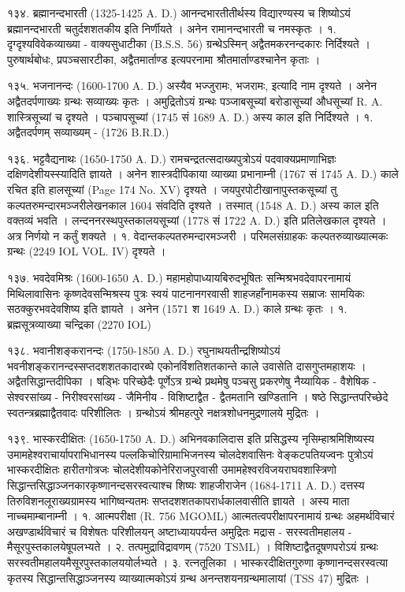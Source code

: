 १३४. ब्रह्मानन्दभारती (1325-1425 A. D.)
आनन्दभारतीतीर्थस्य विद्यारण्यस्य च शिष्योऽयं ब्रह्मानन्दभारती चतुर्दशशतकीय इति निर्णीयते । अनेन रामानन्दभारती च नमस्कृतः ।
१. दृग्दृश्यविवेकव्याख्या - वाक्यसुधाटीका (B.S.S. 56) ग्रन्थेऽस्मिन् अद्वैतमकरनन्दकारः निर्दिश्यते ।
पुरुषार्थबोधः, प्रपञ्चसारटीका, अद्वैतमार्ताण्ड इत्यपरनामा श्रौतमार्ताण्डश्चानेेन कृताः ।

१३५. भजनानन्दः (1600-1700 A. D.)
अस्यैव भज्जुरामः, भजरामः, इत्यादि नाम दृश्यते । अनेन अद्वैतदर्पणाख्यः ग्रन्थः सव्याख्यः कृतः । अमुद्रितोऽयं ग्रन्थः पञ्जाबसूच्यां बरोडासूच्यां औधसूच्यां R. A. शास्त्रिसूच्यां च दृश्यते । पञ्चापसूच्यां (1745 सं 1689 A. D.) अस्य काल इति निर्दिश्यते ।
१. अद्वैतदर्पणम् सव्याख्यम् - (1726 B.R.D.)

१३६. भट्टवैद्यनाथः (1650-1750 A. D.)
रामचन्द्रतत्सदाख्यपुत्रोऽयं पदवाक्यप्रमाणाभिज्ञः दक्षिणदेशीयस्स्यादिति ज्ञायते । अनेन शास्त्रदीपिकाया व्याख्या प्रभानाम्नी (1767 सं 1745 A. D.) काले रचित इति हालसूच्यां (Page 174 No. XV) दृश्यते । जयपुरपोटीखानापुस्तकसूच्यां तु कल्पतरुमन्दारमञ्जरीलेखनकाल 1604 संवदिति दृश्यते । तस्मात् (1548 A. D.) अस्य काल इति वक्तव्यं भवति । लन्दननरस्थपुस्तकालयसूच्यां (1778 सं 1722 A. D.) इति प्रतिलेखकाल दृश्यते । अत्र निर्णयो न कर्तुं शक्यते ।
१. वेदान्तकल्पतरुमन्दारमञ्जरी । परिमलसंग्राहकः कल्पतरुव्याख्यात्मकः ग्रन्थः (2249 IOL VOL. IV) दृश्यते ।

१३७. भवदेवमिश्रः (1600-1650 A. D.)
महामहोपाध्यायबिरुदभूषितः सन्मिश्रभवदेवापरनामायं मिथिलावासिनः कृष्णदेवसन्मिश्रस्य पुत्रः स्वयं पाटनानगरवासी शाहजहाँनामकस्य सम्राजः सामयिकः सठक्कुरभवदेवशिष्य इति ज्ञायते । अनेन (1571 श 1649 A. D.) काले ग्रन्थः कृतः ।
१. ब्रह्मसूत्रव्याख्या चन्द्रिका (2270 IOL)

१३८. भवानीशङ्करानन्दः (1750-1850 A. D.)
रघुनाथयतीन्द्रशिष्योऽयं भवनीशङ्करानन्दस्सप्तदशशतकादारब्घे एकोनर्विशतिशतकान्ते काले उवासेति दासगुप्तमहाशयः । अद्वैतसिद्धान्तदीपिका । षड्भिः परिच्छेदैः पूर्णेऽत्र ग्रन्थे प्रथमेषु पञ्चसु प्रकरणेषु नैय्यायिक - वैशेषिक - सेश्वरसांख्य - निरीश्वरसांख्य - जैमिनीय - विशिष्टाद्वैत - द्वैतमतानि खण्डितानि । षष्ठे सिद्धान्तपरिच्छेदे स्वतन्त्रब्रह्माद्वैतवादः परिशीलितः । ग्रन्थोऽयं श्रीमहत्पुरे नक्षत्रशोधनमुद्रणालये मुद्रितः ।

१३९. भास्करदीक्षितः (1650-1750 A. D.)
अभिनवकालिदास इति प्रसिद्धस्य नृसिम्हाश्रमिशिष्यस्य उमामहेश्वराचार्यापराभिधानस्य पल्लकिचोरिग्रामाभिजनस्य चोलदेशवासिनः वेङ्कटपतियज्वनः पुत्रोऽयं भास्करदीक्षितः हारीतगोत्रजः चोलदेशीयकोनेरिराजपुरवासी उमामहेश्वरविजयराघवशास्त्रिणो सिद्धान्तसिद्धाञ्जनकारकृष्णानन्दसरस्वत्याश्च शिष्यः शाहजीराजेन (1684-1711 A. D.) दत्तस्य तिरुविशनलूराख्यग्रामस्य भागिष्वन्यतमः सप्तदशशतकापरार्धकालवासीति ज्ञायते । अस्य माता नाच्चमाम्बानाम्नी ।
१. आत्मपरीक्षा (R. 756 MGOML) आत्मतत्वपरीक्षापरनामायं ग्रन्थः अहमर्थविचारं अखण्डार्थविचारं च विशेषतः परिशीलयन् अष्टाध्यायपर्यन्त अमुद्रितः मद्रास - सरस्वतीमहालय - मैसूरपुस्तकालयेषूपलभ्यते ।
२. तत्पमुद्राविद्रावणम् (7520 TSML) । विशिष्टाद्वैतदूषणपरोऽयं ग्रन्थः सरस्वतीमहालयमैसूरपुस्तकालययोर्लभ्यते ।
३. रत्नतूलिका । भास्करदीक्षितगुरुणा कृष्णानन्दसरस्वत्या कृतस्य सिद्धान्तसिद्धाञ्जनस्य व्याख्यात्मकोऽयं ग्रन्थ अनन्तशयनग्रन्थमालायां (TSS 47) मुद्रितः ।

